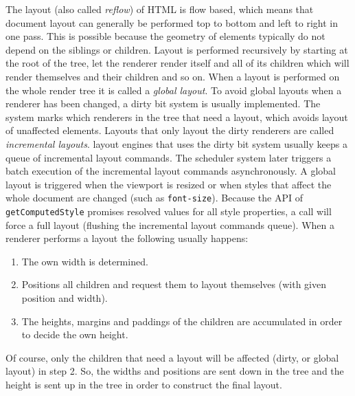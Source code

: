 \documentclass[a4paper,11pt]{kth-mag}
\newcommand{\code}[1]{\texttt{#1}}
\begin{document}
        The layout (also called \emph{reflow}) of \gls{HTML} is flow based, which means that document layout can generally be performed top to bottom and left to right in one pass.
        This is possible because the geometry of \glspl{element} typically do not depend on the siblings or children.
        Layout is performed recursively by starting at the root of the tree, let the renderer render itself and all of its children which will render themselves and their children and so on.
        When a layout is performed on the whole \gls{render tree} it is called a \emph{global layout}.
        To avoid global layouts when a renderer has been changed, a dirty bit system is usually implemented.
        The system marks which renderers in the tree that need a layout, which avoids layout of unaffected \glspl{element}.
        Layouts that only layout the dirty renderers are called \emph{incremental layouts}.
        \Glspl{layout engine} that uses the dirty bit system usually keeps a queue of incremental layout commands.
        The scheduler system later triggers a batch execution of the incremental layout commands asynchronously.
        A global layout is triggered when the \gls{viewport} is resized or when styles that affect the whole document are changed (such as \code{font-size}).
        Because the \gls{API} of \code{getComputedStyle} promises resolved values for all style properties, a call will force a full layout (flushing the incremental layout commands queue).
        When a renderer performs a layout the following usually happens:
        \begin{enumerate}
          \item The own width is determined.
          \item Positions all children and request them to layout themselves (with given position and width).
          \item The heights, margins and paddings of the children are accumulated in order to decide the own height.
        \end{enumerate}
        Of course, only the children that need a layout will be affected (dirty, or global layout) in step 2.
        So, the widths and positions are sent down in the tree and the height is sent up in the tree in order to construct the final layout.
\end{document}
